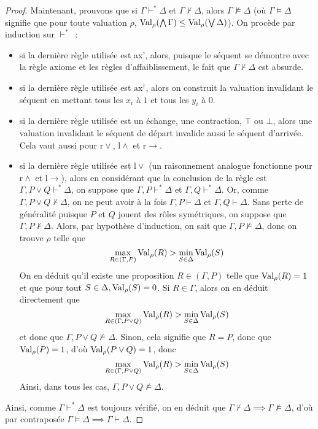 \begin{proof}
  Maintenant, prouvons que si $\Gamma\vdash^*\Delta$ et $\Gamma\nvdash\Delta$,
  alors $\Gamma\nvDash\Delta$ (où $\Gamma\vDash \Delta$ signifie que pour toute
  valuation
  $\rho$, $\operatorname{Val}_\rho(\bigwedge \Gamma) \leq \operatorname{Val}_\rho(\bigvee \Delta)$).
  On procède par induction sur $\vdash^*$~:
  \begin{itemize}
  \item si la dernière règle utilisée est ax', alors, puisque le séquent se
    démontre avec la règle axiome et les règles d'affaiblissement, le fait que
    $\Gamma\nvdash \Delta$ est absurde.
  \item si la dernière règle utilisée est $\mathrm{ax}^\dagger$, alors on
    construit la valuation invalidant le séquent en mettant tous les $x_i$ à
    $1$ et tous les $y_i$ à $0$.
  \item si la dernière règle utilisée est un échange, une contraction, $\top$
    ou $\bot$, alors une valuation invalidant le séquent de départ invalide
    aussi le séquent d'arrivée. Cela vaut aussi pour $\mathrm{r}\lor$,
    $\mathrm{l}\land$ et $\mathrm{r}\to$.
  \item si la dernière règle utilisée est $\mathrm{l}\lor$ (un raisonnement
    analogue fonctionne pour $\mathrm{r}\land$ et $\mathrm{l}\to$), alors
    en considérant que la conclusion de la règle est
    $\Gamma, P \lor Q \vdash^* \Delta$, on suppose que
    $\Gamma, P \vdash^* \Delta$ et $\Gamma, Q \vdash^* \Delta$.
    Or, comme $\Gamma, P\lor Q\nvdash \Delta$, on ne peut avoir à la fois
    $\Gamma, P \vdash \Delta$ et $\Gamma, Q \vdash \Delta$. Sans perte de
    généralité puisque $P$ et $Q$ jouent des rôles symétriques, on suppose que
    $\Gamma, P \nvdash \Delta$. Alors, par hypothèse d'induction, on sait que
    $\Gamma, P \nvDash \Delta$, donc on trouve $\rho$ telle que
    \[\max_{R \in (\Gamma, P)} \operatorname{Val}_\rho(R) > \min_{S \in \Delta} \operatorname{Val}_\rho(S)\]
    On en déduit qu'il existe une proposition $R \in (\Gamma, P)$ telle que
    $\operatorname{Val}_\rho(R) = 1$ et que pour tout $S\in \Delta, \operatorname{Val}_\rho(S) = 0$.
    Si $R \in \Gamma$, alors on en déduit directement que
    \[\max_{R\in (\Gamma, P \lor Q)} \operatorname{Val}_\rho(R) > \min_{S\in\Delta} \operatorname{Val}_\rho(S)\]
    et donc que $\Gamma, P \lor Q \nvDash \Delta$. Sinon, cela signifie que
    $R = P$, donc que $\operatorname{Val}_\rho(P) = 1$, d'où $\operatorname{Val}_\rho(P\lor Q) = 1$, donc
    \[\max_{R\in (\Gamma, P \lor Q)} \operatorname{Val}_\rho(R) > \min_{S\in\Delta} \operatorname{Val}_\rho(S)\]
    Ainsi, dans tous les cas, $\Gamma, P \lor Q \nvDash \Delta$.
  \end{itemize}

  Ainsi, comme $\Gamma\vdash^*\Delta$ est toujours vérifié, on en déduit que
  $\Gamma\nvdash\Delta\implies\Gamma\nvDash\Delta$, d'où par contraposée
  $\Gamma\vDash\Delta\implies\Gamma\vdash\Delta$.
\end{proof}


